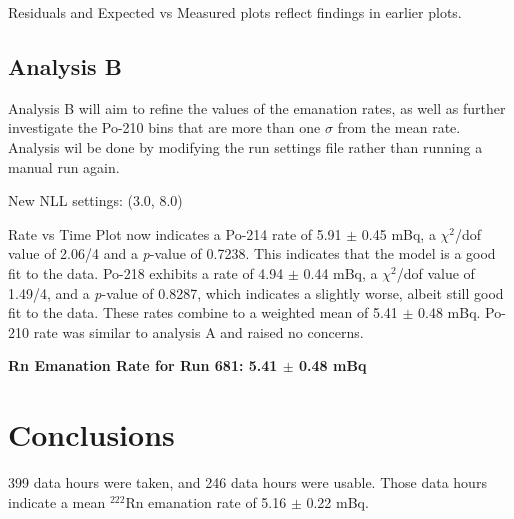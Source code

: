 \documentclass[letterpaper, 12pt]{article}
\begin{document}
Residuals and Expected vs Measured plots reflect findings in earlier plots.

\subsection{Analysis B}
Analysis B will aim to refine the values of the emanation rates, as well as 
further investigate the Po-210 bins that are more than one $\sigma$ from the 
mean rate. Analysis wil be done by modifying the run settings file rather than
running a manual run again.

New NLL settings: (3.0, 8.0)

Rate vs Time Plot now indicates a Po-214 rate of 5.91 $\pm$ 0.45 mBq, a 
$\chi$$^{2}$/dof value of 2.06/4 and a \textit{p}-value of 0.7238. This indicates
that the model is a good fit to the data. Po-218 exhibits a rate of 4.94 $\pm$ 
0.44 mBq, a $\chi$$^{2}$/dof value of 1.49/4, and a \textit{p}-value of 0.8287, 
which indicates a slightly worse, albeit still good fit to the data. These rates
combine to a weighted mean of 5.41 $\pm$ 0.48 mBq. Po-210 rate was similar to 
analysis A and raised no concerns.
\newline

\begin{center}
\textbf{Rn Emanation Rate for Run 681: 5.41 $\pm$ 0.48 mBq}
\end{center}

\section{Conclusions}
399 data hours were taken, and 246 data hours were usable. Those data hours 
indicate a mean $^{222}$Rn emanation rate of 5.16 $\pm$ 0.22 mBq.
\end{document}

